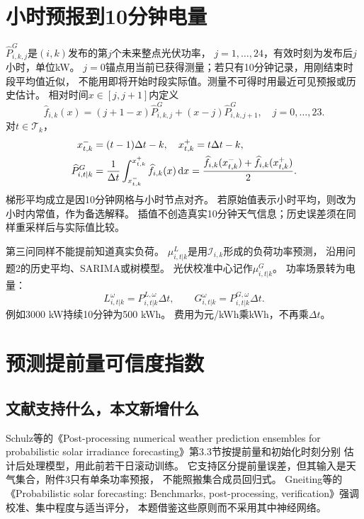 \documentclass[UTF8,11pt]{ctexart}
\begin{document}
\section{小时预报到10分钟电量}
$\widehat P^G_{i,k,j}$是$(i,k)$发布的第$j$个未来整点光伏功率，
$j=1,\ldots,24$，有效时刻为发布后$j$小时，单位kW。
$j=0$锚点用当前已获得测量；若只有10分钟记录，用刚结束时段平均值近似，
不能用即将开始时段实际值。测量不可得时用最近可见预报或历史估计。
相对时间$x\in[j,j+1]$内定义
\begin{equation}
 \widehat f_{i,k}(x)=(j+1-x)\widehat P^G_{i,k,j}
                  +(x-j)\widehat P^G_{i,k,j+1},\quad j=0,\ldots,23.
\end{equation}
对$t\in\mathcal T_k$，
\begin{align}
 x^-_{t,k}&=(t-1)\Delta t-k,\quad x^+_{t,k}=t\Delta t-k,\\
 \widehat P^G_{i,t|k}
 &=\frac1{\Delta t}\int_{x^-_{t,k}}^{x^+_{t,k}}\widehat f_{i,k}(x)\,{\rm d}x
 =\frac{\widehat f_{i,k}(x^-_{t,k})+\widehat f_{i,k}(x^+_{t,k})}{2}.
\end{align}
梯形平均成立是因10分钟网格与小时节点对齐。
若原始值表示小时平均，则改为小时内常值，作为备选解释。
插值不创造真实10分钟天气信息；历史误差须在同样重采样后与实际值比较。

第三问同样不能提前知道真实负荷。
$\mu^L_{i,t|k}$是用$\mathcal I_{i,k}$形成的负荷功率预测，
沿用问题2的历史平均、SARIMA或树模型。
光伏校准中心记作$\mu^G_{i,t|k}$。
功率场景转为电量：
\begin{equation}\label{eq:conversion}
 L^\omega_{i,t|k}=P^{L,\omega}_{i,t|k}\Delta t,\qquad
 G^\omega_{i,t|k}=P^{G,\omega}_{i,t|k}\Delta t .
\end{equation}
例如3000 kW持续10分钟为500 kWh。
费用为元/kWh乘kWh，不再乘$\Delta t$。

\section{预测提前量可信度指数}
\subsection{文献支持什么，本文新增什么}
Schulz等的《Post-processing numerical weather prediction ensembles for probabilistic
solar irradiance forecasting》\cite{schulz2021}第3.3节按提前量和初始化时刻分别
估计后处理模型，用此前若干日滚动训练。
它支持区分提前量误差，但其输入是天气集合，附件3只有单条功率预报，
不能照搬集合成员回归式。
Gneiting等的《Probabilistic solar forecasting: Benchmarks, post-processing,
verification》\cite{gneiting2023}强调校准、集中程度与适当评分，
本题借鉴这些原则而不采用其中神经网络。
\end{document}
